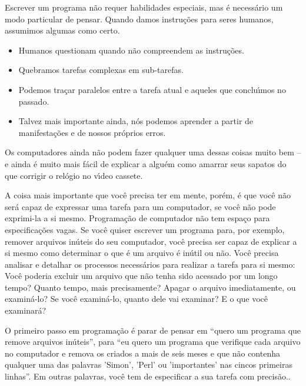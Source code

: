 \documentclass[a4paper,11pt]{book}
\begin{document}
\noindent 

\noindent Escrever um programa n\~ao requer habilidades especiais, mas \'e necess\'ario um modo particular de pensar. Quando damos instru\c{c}\~oes para seres humanos, assumimos algumas como certo.

\begin{itemize}

 \item Humanos questionam quando n\~ao compreendem as instru\c{c}\~oes.

 \item Quebramos tarefas complexas em sub-tarefas.

 \item Podemos tra\c{c}ar paralelos entre a tarefa atual e aqueles que conclu\'{\i}mos no passado.

 \item Talvez mais importante ainda, n\'os podemos aprender a partir de manifesta\c{c}\~oes e de nossos pr\'oprios erros.

\end{itemize} 

\noindent Os computadores ainda n\~ao podem fazer qualquer uma dessas coisas muito bem – e ainda \'e muito mais f\'acil de explicar a algu\'em como amarrar seus sapatos do que corrigir o rel\'ogio no v\'{\i}deo cassete.

\noindent 

\noindent A coisa mais importante que voc\^e precisa ter em mente, por\'em, \'e que voc\^e n\~ao ser\'a capaz de expressar uma tarefa para um computador, se voc\^e n\~ao pode exprimi-la a si mesmo. Programa\c{c}\~ao de computador n\~ao tem espa\c{c}o para especifica\c{c}\~oes vagas. Se voc\^e quiser escrever um programa para, por exemplo, remover arquivos in\'uteis do seu computador, voc\^e precisa ser capaz de explicar a si mesmo como determinar o que \'e um arquivo \'e in\'util ou n\~ao. Voc\^e precisa analisar e detalhar os processos necess\'arios para realizar a tarefa para si mesmo: Voc\^e poderia excluir um arquivo que n\~ao tenha sido acessado por um longo tempo? Quanto tempo, mais precisamente? Apagar o arquivo imediatamente, ou examin\'a-lo? Se voc\^e examin\'a-lo, quanto dele vai examinar? E o que voc\^e examinar\'a?

\noindent 

\noindent O primeiro passo em programa\c{c}\~ao \'e parar de pensar em “quero um programa que remove arquivos in\'uteis”, para “eu quero um programa que verifique cada arquivo no computador e remova os criados a mais de seis meses e que n\~ao contenha qualquer uma das palavras 'Simon', 'Perl' ou 'importantes' nas cincos primeiras linhas”. Em outras palavras, voc\^e tem de especificar a sua tarefa com precis\~ao..
\end{document}

